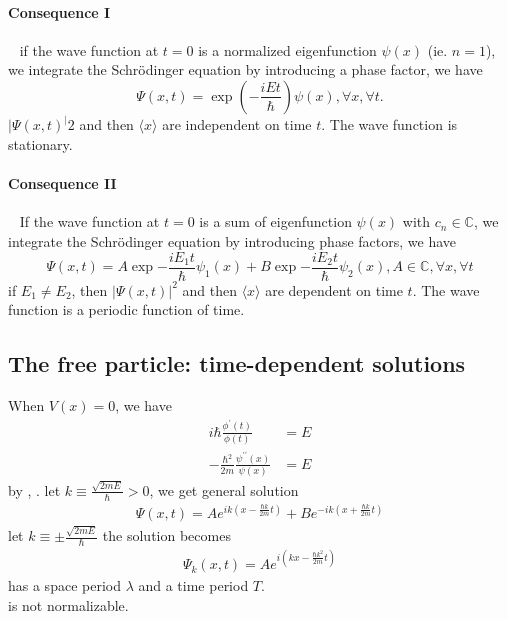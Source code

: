 \paragraph{Consequence I}~{
    if the wave function at $t=0$ is a normalized eigenfunction $\psi(x)$ (ie. $n=1$), we integrate the Schrödinger equation by introducing a phase factor, we have
$$
\Psi(x,t) = \exp(-\frac{iEt}{\hbar})\psi(x), \forall x, \forall t.
$$
$|\Psi(x,t)^|2$ and then $\langle x\rangle$ are independent on time $t$. The wave function is stationary.
}

\paragraph{Consequence II}~{
If the wave function at $t=0$ is a sum of eigenfunction $\psi(x)$ with $c_n \in \mathbb{C} $, we integrate the Schrödinger equation by introducing phase factors, we have
$$
\Psi(x,t) = A \exp{-\frac{iE_1 t}{\hbar}}\psi_1(x) + B \exp{-\frac{iE_2 t}{\hbar}}\psi_2(x), A \in \mathbb{C},\forall x, \forall t
$$
if $E_1\neq E_2$, then $|\Psi(x,t)|^2$ and then $\langle x\rangle$ are dependent on time $t$. The wave function is a periodic function of time.
}






\subsection{The free particle: time-dependent solutions}
When $V(x)=0$, we have 
\begin{align*}
    i \hbar \frac{\phi^{\prime}(t)}{\phi(t)}                            & =E  \\
    -\frac{\hbar^{2}}{2 m} \frac{\psi^{\prime \prime}(x)}{\psi(x)} & =E
\end{align*}
by , . let $k \equiv \frac{\sqrt{2 m E}}{\hbar} > 0$, we get general solution
\begin{align*}
    \Psi(x, t)=A e^{i k\left(x-\frac{\hbar k}{2 m} t\right)}+B e^{-i k\left(x+\frac{\hbar k}{2 m} t\right)}
\end{align*}
let $k \equiv \pm \frac{\sqrt{2 m E}}{\hbar}$
the solution becomes
\begin{align}
    \Psi_{k}(x, t)=A e^{i\left(k x-\frac{\hbar k^{2}}{2 m} t\right)} \label{eq14}
\end{align}
 has a space period $\lambda$ and a time period $T$.\\
 is not normalizable.






























